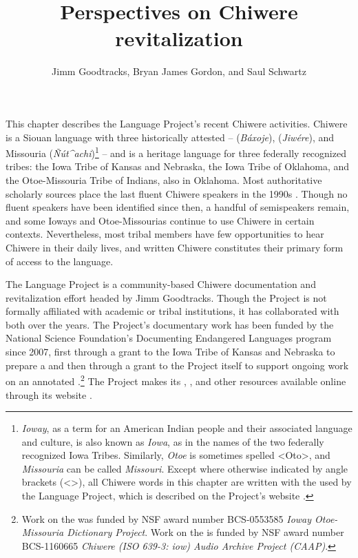 \documentclass[output=paper]{LSP/langsci}
\author{Jimm Goodtracks, Bryan James Gordon, and Saul Schwartz}
\title{Perspectives on {Chiwere} revitalization}
\begin{document}
This chapter describes the  Language Project's recent Chiwere  activities. Chiwere is a Siouan language with three historically attested  --  (\emph{Báxoje}),  (\emph{Jiwére}), and Missouria (\emph{\~Nút\^{ }achi})\footnote{\emph{Ioway}, as a term for an American Indian people and their associated language and culture, is also known as \emph{Iowa}, as in the names of the two federally recognized Iowa Tribes. Similarly, \emph{Otoe} is sometimes spelled <Oto>, and \emph{Missouria} can be called \emph{Missouri}. Except where otherwise indicated by angle brackets (<>), all Chiwere words in this chapter are written with the  used by the  Language Project, which is described on the Project's website \citep{GoodtracksND}.} -- and is a heritage language for three federally recognized tribes: the Iowa Tribe of Kansas and Nebraska, the Iowa Tribe of Oklahoma, and the Otoe-Missouria Tribe of Indians, also in Oklahoma. Most authoritative scholarly sources place the last fluent Chiwere speakers in the 1990s \citep{Lewisetal2013, ParksRankin2001}. Though no fluent speakers have been identified since then, a handful of semispeakers remain, and some Ioways and Otoe-Missourias continue to use Chiwere in certain contexts. Nevertheless, most tribal members have few opportunities to hear Chiwere in their daily lives, and written Chiwere constitutes their primary form of access to the language.

The  Language Project is a community-based Chiwere documentation and revitalization effort headed by Jimm Goodtracks. Though the Project is not formally affiliated with academic or tribal institutions, it has collaborated with both over the years. The Project's documentary work has been funded by the National Science Foundation's Documenting Endangered Languages program since 2007, first through a grant to the Iowa Tribe of Kansas and Nebraska to prepare a  and then through a grant to the Project itself to support ongoing work on an annotated .\footnote{Work on the  was funded by NSF award number BCS-0553585 \emph{Ioway Otoe-Missouria Dictionary Project}. Work on the  is funded by NSF award number BCS-1160665 \emph{Chiwere (ISO 639-3: iow) Audio Archive Project (CAAP)}.}  The Project makes its , , and other resources available online through its website \citep{GoodtracksND}. 
\end{document}
